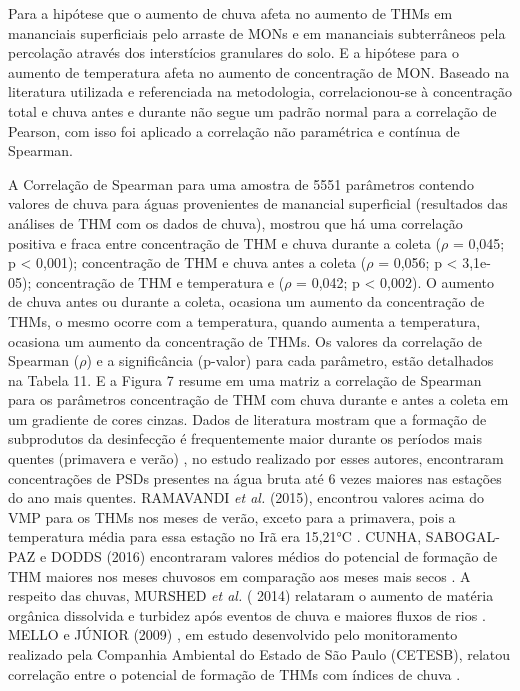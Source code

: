 

Para a hipótese que o aumento de chuva afeta no aumento de THMs em mananciais superficiais pelo arraste de MONs e em mananciais subterrâneos pela percolação através dos interstícios granulares do solo. E a hipótese para o aumento de temperatura afeta no aumento de concentração de MON. Baseado na literatura utilizada e referenciada na metodologia, correlacionou-se à concentração total e chuva antes e durante não segue um padrão normal para a correlação de Pearson, com isso foi aplicado a correlação não paramétrica e contínua de Spearman.

A Correlação de Spearman para uma amostra de 5551 parâmetros contendo valores de chuva para águas provenientes de manancial superficial (resultados das análises de THM com os dados de chuva), mostrou que há uma correlação positiva e fraca entre concentração de THM e chuva durante a coleta ($\rho$ = 0,045; p < 0,001); concentração de THM e chuva antes a coleta ($\rho$ = 0,056; p < 3,1e-05); concentração de THM e temperatura e ($\rho$ = 0,042; p < 0,002). O aumento de chuva antes ou durante a coleta, ocasiona um aumento da concentração de THMs, o mesmo ocorre com a temperatura, quando aumenta a temperatura, ocasiona um aumento da concentração de THMs.
Os valores da correlação de Spearman ($\rho$) e a significância (p-valor) para cada parâmetro, estão detalhados na Tabela 11. E a Figura 7 resume em uma matriz a correlação de Spearman para os parâmetros concentração de THM com chuva durante e antes a coleta em um gradiente de cores cinzas. Dados de literatura mostram que a formação de subprodutos da desinfecção é frequentemente maior durante os períodos mais quentes (primavera e verão) \cite{SERRANO2015246}, no estudo realizado por esses autores, encontraram concentrações de PSDs presentes na água bruta até 6 vezes maiores nas estações do ano mais quentes. RAMAVANDI \textit{et al.} (2015),   encontrou valores acima do VMP para os THMs nos meses de verão, exceto para a primavera, pois a temperatura média para essa estação no Irã era 15,21°C \cite{RAMAVANDI20151}. CUNHA, SABOGAL-PAZ e DODDS (2016) encontraram valores médios do potencial de formação de THM maiores nos meses chuvosos em comparação aos meses mais secos \cite{CUNHA2016516}. A respeito das chuvas, MURSHED \textit{et al.} ( 2014) relataram o aumento de matéria orgânica dissolvida e turbidez após eventos de chuva e maiores fluxos de rios \cite{MURSHED20141985}. MELLO e JÚNIOR (2009) , em estudo desenvolvido pelo monitoramento realizado pela Companhia Ambiental do Estado de São Paulo (CETESB), relatou correlação entre o potencial de formação de THMs com índices de chuva \cite{demelo2009}.




